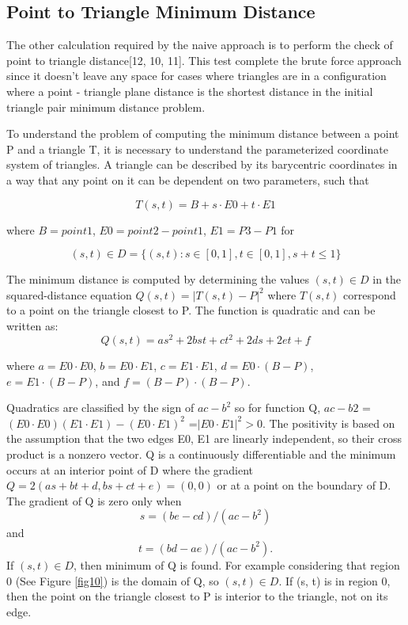 \documentclass[times,12pt]{ACME2015article}
\begin{document}
\subsection{Point to Triangle Minimum Distance}
The other calculation required by the naive approach is to perform the check of point to triangle distance[12, 10, 11]. This test complete the brute force approach since it doesn't leave any  space for cases where triangles are in a configuration where a point - triangle plane distance is the shortest distance in the initial triangle pair minimum distance problem. 

To understand the problem of computing the minimum distance between a point P and a triangle T, it is necessary to understand the parameterized coordinate system of triangles. A triangle can be described by its barycentric coordinates in a way that any point on it can be dependent on two parameters, such that 

$$T(s, t) = B + s \cdot E0 + t \cdot E1$$

where $B = point1$, $E0 = point2-point1$, $E1 = P3 - P1$ for 

$$(s,t) \in D = \{(s,t) : s \in [0,1],t \in [0,1],s + t ≤ 1\}$$ 

The minimum distance is computed by determining the values $(s, t) \in D$ in the squared-distance equation $Q(s, t) = |T(s, t) - P|^2$ where $T(s,t)$ correspond to a point on the triangle closest to P. The function is quadratic and can be written as: 
$$Q(s,t)=as^2 +2bst+ct^2 +2ds+2et+f$$

where $a = E0 \cdot E0$, $b = E0 \cdot E1$, $c = E1 \cdot E1$, $d = E0 \cdot (B - P)$, $e = E1 \cdot (B - P)$, and $f = (B - P) \cdot (B - P)$.

Quadratics are classified by the sign of $ac - b^2$ so for function Q, $ac - b2$ = $(E0 \cdot E0)(E1 \cdot E1) - (E0 \cdot E1)^2$ =$|E0 \cdot E1|^2 >0$. The positivity is based on the assumption that the two edges E0, E1 are linearly independent, so their cross product is a nonzero vector. Q is a continuously differentiable and the minimum occurs at an interior point of D where the gradient $Q = 2(as + bt + d, bs + ct + e) = (0, 0)$ or at a point on the boundary of D. The gradient of Q is zero only when 
$$s = (be - cd)/(ac - b^2)$$ and 
$$t = (bd - ae)/(ac - b^2).$$ 
If $(s,t) \in D$, then minimum of Q is found. For example considering that region 0 (See Figure \ref{fig10}) is the domain of Q, so $(s, t) \in D$. If (s, t) is in region 0, then the point on the triangle closest to P is interior to the triangle, not on its edge.
\end{document}
